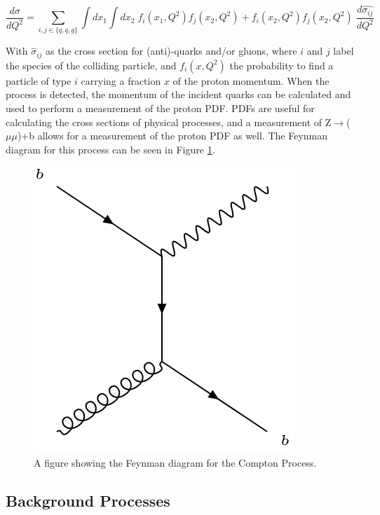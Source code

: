 \documentclass[12pt,a4paper,epsf,portrait,times,epsfig]{article}
\begin{document}
		\begin{center}
			\begin{equation}
			\frac{d\sigma}{dQ^{2}}=\sum_{i,j\in \{q,\overline{q},g\}}\int dx_{1}\int dx_{2}\; f_{i}(x_{1},Q^{2})f_{j}(x_{2},Q^{2})+f_{i}(x_{2},Q^{2})f_{j}(x_{2},Q^{2})\;\frac{d\hat{\sigma_{ij}}}{dQ^{2}}
			\end{equation}
		\end{center}
		
		With $\hat{\sigma}_{ij}$ as the cross section for (anti)-quarks and/or gluons, where $i$ and $j$ label the species of the colliding particle, and $f_{i}(x,Q^{2})$ the probability to find a particle of type $i$ carrying a fraction $x$ of the proton momentum\cite{Article:PartonDistributions}. When the process is detected, the momentum of the incident quarks can be calculated and used to perform a measurement of the proton PDF. PDFs are useful for calculating the cross sections of physical processes, and a measurement of Z$\rightarrow$($\mu\mu$)+b allows for a measurement of the proton PDF as well. The Feynman diagram for this process can be seen in Figure \ref{Fig:ZbbCompton}.
		
		\begin{figure}[h!]
			\centering
			\includegraphics[scale=0.5]{Zbb_3.png}
			\caption{A figure showing the Feynman diagram for the Compton Process.}
			\label{Fig:ZbbCompton} 
		\end{figure}
			
		\subsection{Background Processes}
	
\end{document}
